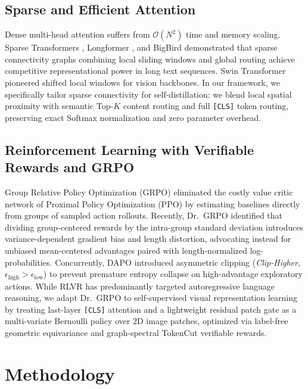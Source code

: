 \documentclass[11pt,a4paper]{article}
\begin{document}
\subsection{Sparse and Efficient Attention}
Dense multi-head attention suffers from $\mathcal{O}(N^2)$ time and memory scaling. Sparse Transformers \cite{child2019generating}, Longformer \cite{beltagy2020longformer}, and BigBird \cite{zaheer2020bigbird} demonstrated that sparse connectivity graphs combining local sliding windows and global routing achieve competitive representational power in long text sequences. Swin Transformer \cite{liu2021swin} pioneered shifted local windows for vision backbones. In our framework, we specifically tailor sparse connectivity for self-distillation: we blend local spatial proximity with semantic Top-$K$ content routing and full \texttt{[CLS]} token routing, preserving exact Softmax normalization and zero parameter overhead.

\subsection{Reinforcement Learning with Verifiable Rewards and GRPO}
Group Relative Policy Optimization (GRPO) \cite{shao2024deepseekmath} eliminated the costly value critic network of Proximal Policy Optimization (PPO) by estimating baselines directly from groups of sampled action rollouts. Recently, Dr.\ GRPO \cite{liu2025drgrpo} identified that dividing group-centered rewards by the intra-group standard deviation introduces variance-dependent gradient bias and length distortion, advocating instead for unbiased mean-centered advantages paired with length-normalized log-probabilities. Concurrently, DAPO \cite{yu2025dapo} introduced asymmetric clipping (\textit{Clip-Higher}, $\epsilon_{\text{high}} > \epsilon_{\text{low}}$) to prevent premature entropy collapse on high-advantage exploratory actions. While RLVR has predominantly targeted autoregressive language reasoning, we adapt Dr.\ GRPO to self-supervised visual representation learning by treating last-layer \texttt{[CLS]} attention and a lightweight residual patch gate as a multi-variate Bernoulli policy over 2D image patches, optimized via label-free geometric equivariance and graph-spectral TokenCut \cite{wang2022tokencut} verifiable rewards.

\section{Methodology}
\label{sec:method}
\end{document}
